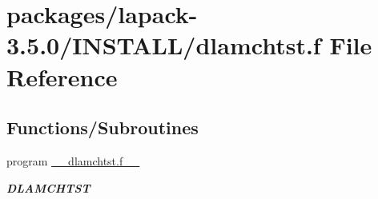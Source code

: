 \hypertarget{dlamchtst_8f}{}\section{packages/lapack-\/3.5.0/\+I\+N\+S\+T\+A\+L\+L/dlamchtst.f File Reference}
\label{dlamchtst_8f}
\subsection*{Functions/\+Subroutines}
\begin{DoxyCompactItemize}
\item 
program \hyperlink{group__auxOTHERauxiliary_gafdbf236050aae6e38c07d118c3611f96}{\+\_\+\+\_\+dlamchtst.\+f\+\_\+\+\_\+}
\begin{DoxyCompactList}\small\item\em {\bfseries D\+L\+A\+M\+C\+H\+T\+S\+T} \end{DoxyCompactList}\end{DoxyCompactItemize}
